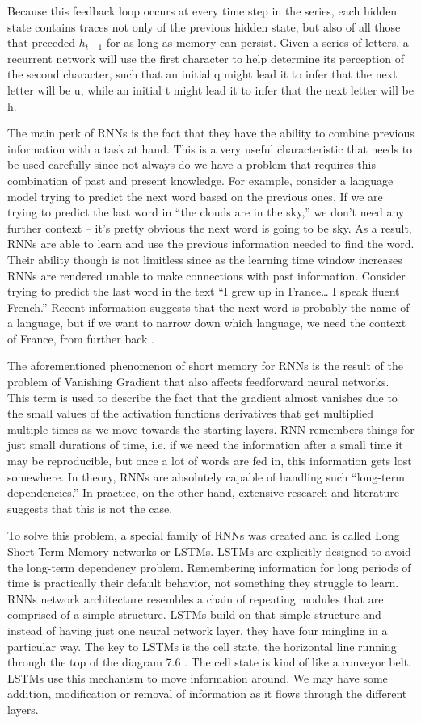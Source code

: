 Because this feedback loop occurs at every time step in the series, each hidden state contains traces not only of the previous hidden state, but also of all those that preceded $h_{t-1}$ for as long as memory can persist. Given a series of letters, a recurrent network will use the first character to help determine its perception of the second character, such that an initial q might lead it to infer that the next letter will be u, while an initial t might lead it to infer that the next letter will be h.
\par The main perk of RNNs is the fact that they have the ability to combine previous information with a task at hand. This is a very useful characteristic that needs to be used carefully since not always do we have a problem that requires this combination of past and present knowledge. For example, consider a language model trying to predict the next word based on the previous ones. If we are trying to predict the last word in “the clouds are in the sky,” we don’t need any further context – it’s pretty obvious the next word is going to be sky. As a result, RNNs are able to learn and use the previous information needed to find the word. Their ability though is not limitless since as the learning time window increases RNNs are rendered unable to make connections with past information. Consider trying to predict the last word in the text “I grew up in France… I speak fluent French.” Recent information suggests that the next word is probably the name of a language, but if we want to narrow down which language, we need the context of France, from further back \cite{tripathi2008short}. 
\par The aforementioned phenomenon of short memory for RNNs is the result of the problem of Vanishing Gradient that also affects feedforward neural networks. This term is used to describe the fact that the gradient almost vanishes due to the small values of the activation functions derivatives that get multiplied multiple times as we move towards the starting layers. RNN remembers things for just small durations of time, i.e. if we need the information after a small time it may be reproducible, but once a lot of words are fed in, this information gets lost somewhere. 
In theory, RNNs are absolutely capable of handling such “long-term dependencies.” In practice, on the other hand, extensive research and literature suggests that this is not the case.
\par To solve this problem, a special family of RNNs was created and is called Long Short Term Memory networks or LSTMs. LSTMs are explicitly designed to avoid the long-term dependency problem. Remembering information for long periods of time is practically their default behavior, not something they struggle to learn. RNNs network architecture resembles a chain of repeating modules that are comprised of a simple structure. LSTMs build on that simple structure and instead of having just one neural network layer, they have four mingling in a particular way. The key to LSTMs is the cell state, the horizontal line running through the top of the diagram 7.6  \cite{olah2015understanding}. The cell state is kind of like a conveyor belt. LSTMs use this mechanism to move information around. We may have some addition, modification or removal of information as it flows through the different layers.
